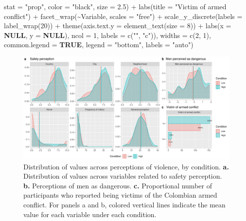 \documentclass[
  bookmarksnumbered]{article}
\newenvironment{Shaded}{\begin{snugshade}}{\end{snugshade}}
\newcommand{\AttributeTok}[1]{\textcolor[rgb]{0.80,0.80,0.80}{#1}}
\newcommand{\ConstantTok}[1]{\textcolor[rgb]{0.86,0.64,0.64}{\textbf{#1}}}
\newcommand{\DecValTok}[1]{\textcolor[rgb]{0.86,0.86,0.80}{#1}}
\newcommand{\FloatTok}[1]{\textcolor[rgb]{0.75,0.75,0.82}{#1}}
\newcommand{\FunctionTok}[1]{\textcolor[rgb]{0.94,0.94,0.56}{#1}}
\newcommand{\NormalTok}[1]{\textcolor[rgb]{0.80,0.80,0.80}{#1}}
\newcommand{\SpecialCharTok}[1]{\textcolor[rgb]{0.86,0.64,0.64}{#1}}
\newcommand{\StringTok}[1]{\textcolor[rgb]{0.80,0.58,0.58}{#1}}
\begin{document}
\begin{Shaded}
\begin{Highlighting}[]
                                \AttributeTok{stat =} \StringTok{"prop"}\NormalTok{,}
                                \AttributeTok{color =} \StringTok{"black"}\NormalTok{,}
                                \AttributeTok{size =} \FloatTok{2.5}\NormalTok{) }\SpecialCharTok{+}
                      \FunctionTok{labs}\NormalTok{(}\AttributeTok{title =} \StringTok{"Victim of armed conflict"}\NormalTok{) }\SpecialCharTok{+}
                      \FunctionTok{facet\_wrap}\NormalTok{(}\SpecialCharTok{\textasciitilde{}}\NormalTok{Variable, }\AttributeTok{scales =} \StringTok{"free"}\NormalTok{) }\SpecialCharTok{+}
                      \FunctionTok{scale\_y\_discrete}\NormalTok{(}\AttributeTok{labels =} \FunctionTok{label\_wrap}\NormalTok{(}\DecValTok{20}\NormalTok{)) }\SpecialCharTok{+}
                      \FunctionTok{theme}\NormalTok{(}\AttributeTok{axis.text.y =} \FunctionTok{element\_text}\NormalTok{(}\AttributeTok{size =} \DecValTok{8}\NormalTok{)) }\SpecialCharTok{+}
                      \FunctionTok{labs}\NormalTok{(}\AttributeTok{x =} \ConstantTok{NULL}\NormalTok{, }\AttributeTok{y =} \ConstantTok{NULL}\NormalTok{),}
                    \AttributeTok{ncol =} \DecValTok{1}\NormalTok{,}
                    \AttributeTok{labels =} \FunctionTok{c}\NormalTok{(}\StringTok{""}\NormalTok{, }\StringTok{"c"}\NormalTok{)),}
          \AttributeTok{widths =} \FunctionTok{c}\NormalTok{(}\DecValTok{2}\NormalTok{, }\DecValTok{1}\NormalTok{),}
          \AttributeTok{common.legend =} \ConstantTok{TRUE}\NormalTok{,}
          \AttributeTok{legend =} \StringTok{"bottom"}\NormalTok{,}
          \AttributeTok{labels =} \StringTok{"auto"}\NormalTok{)}
\end{Highlighting}
\end{Shaded}

\begin{figure}
\centering
\includegraphics{Supplementary_material_files/figure-latex/context-violence-desc-plot-1.pdf}
\caption{\label{fig:context-violence-desc-plot}Distribution of values across perceptions of violence, by condition. \textbf{a.} Distribution of values across variables related to safety perception. \textbf{b.} Perceptions of men as dangerous. \textbf{c.} Proportional number of participants who reported being victims of the Colombian armed conflict. For panels a and b, colored vertical lines indicate the mean value for each variable under each condition.}
\end{figure}
\end{document}
